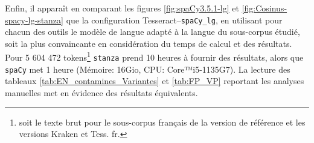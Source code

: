 

Enfin, il apparaît en comparant les figures \ref{fig:spaCy3.5.1-lg} et \ref{fig:Cosinus-spacy-lg-stanza} que la configuration Tesseract--\texttt{spaCy\_lg}, en utilisant pour chacun des outils le modèle de langue adapté à la langue du sous-corpus étudié, soit la plus convaincante en considération du temps de calcul et des résultats. Pour 5 604 472 tokens\footnote{soit le texte brut pour le sous-corpus français de la version de référence et les versions Kraken et Tess. fr.} \texttt{stanza} prend 10 heures à fournir des résultats, alors que \texttt{spaCy} met 1 heure (Mémoire: 16Gio, CPU: Core™i5-1135G7). La lecture des tableaux \ref{tab:EN_contamines_Variantes} et \ref{tab:FP_VP} reportant les analyses manuelles met en évidence des résultats équivalents. 


